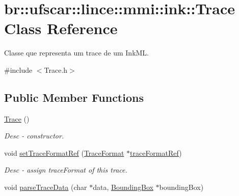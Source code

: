\hypertarget{classbr_1_1ufscar_1_1lince_1_1mmi_1_1ink_1_1Trace}{
\section{br::ufscar::lince::mmi::ink::Trace Class Reference}
\label{classbr_1_1ufscar_1_1lince_1_1mmi_1_1ink_1_1Trace}
}


Classe que representa um trace de um InkML.  




{\ttfamily \#include $<$Trace.h$>$}

\subsection*{Public Member Functions}
\begin{DoxyCompactItemize}
\item 
\hyperlink{classbr_1_1ufscar_1_1lince_1_1mmi_1_1ink_1_1Trace_a87eb33bfb0d672cb8b15e05596c2d185}{Trace} ()
\begin{DoxyCompactList}\small\item\em Desc -\/ constructor. \item\end{DoxyCompactList}\item 
void \hyperlink{classbr_1_1ufscar_1_1lince_1_1mmi_1_1ink_1_1Trace_a2a65005bfc41352c9c9253eef966e8e7}{setTraceFormatRef} (\hyperlink{classbr_1_1ufscar_1_1lince_1_1mmi_1_1ink_1_1TraceFormat}{TraceFormat} $\ast$\hyperlink{classbr_1_1ufscar_1_1lince_1_1mmi_1_1ink_1_1Trace_a87c33c99c915d0ae5808adf580554c42}{traceFormatRef})
\begin{DoxyCompactList}\small\item\em Desc -\/ assign traceFormat of this trace. \item\end{DoxyCompactList}\item 
void \hyperlink{classbr_1_1ufscar_1_1lince_1_1mmi_1_1ink_1_1Trace_aec507a4fd35f2fd65dedc3a4cd168064}{parseTraceData} (char $\ast$data, \hyperlink{structbr_1_1ufscar_1_1lince_1_1mmi_1_1ink_1_1structBoundingBox}{BoundingBox} $\ast$boundingBox)
\end{DoxyCompactItemize}

